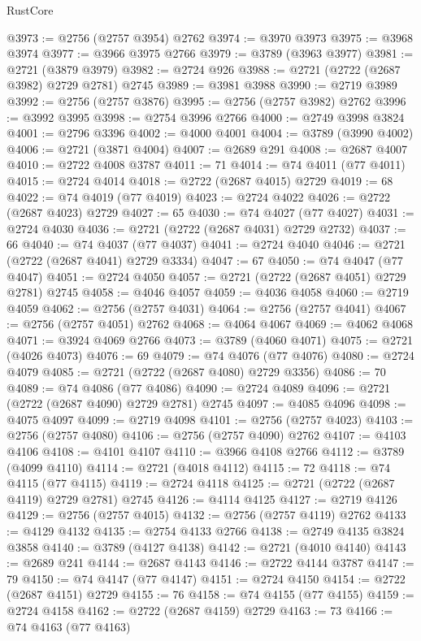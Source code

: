 \begin{lexlean}{RustCore}
\begin{coremodule}
@3973 := @2756 (@2757 @3954) @2762
@3974 := @3970 @3973
@3975 := @3968 @3974
@3977 := @3966 @3975 @2766
@3979 := @3789 (@3963 @3977)
@3981 := @2721 (@3879 @3979)
@3982 := @2724 @926
@3988 := @2721 (@2722 (@2687 @3982) @2729 @2781) @2745
@3989 := @3981 @3988
@3990 := @2719 @3989
@3992 := @2756 (@2757 @3876)
@3995 := @2756 (@2757 @3982) @2762
@3996 := @3992 @3995
@3998 := @2754 @3996 @2766
@4000 := @2749 @3998 @3824
@4001 := @2796 @3396
@4002 := @4000 @4001
@4004 := @3789 (@3990 @4002)
@4006 := @2721 (@3871 @4004)
@4007 := @2689 @291
@4008 := @2687 @4007
@4010 := @2722 @4008 @3787
@4011 := 71
@4014 := @74 @4011 (@77 @4011)
@4015 := @2724 @4014
@4018 := @2722 (@2687 @4015) @2729
@4019 := 68
@4022 := @74 @4019 (@77 @4019)
@4023 := @2724 @4022
@4026 := @2722 (@2687 @4023) @2729
@4027 := 65
@4030 := @74 @4027 (@77 @4027)
@4031 := @2724 @4030
@4036 := @2721 (@2722 (@2687 @4031) @2729 @2732)
@4037 := 66
@4040 := @74 @4037 (@77 @4037)
@4041 := @2724 @4040
@4046 := @2721 (@2722 (@2687 @4041) @2729 @3334)
@4047 := 67
@4050 := @74 @4047 (@77 @4047)
@4051 := @2724 @4050
@4057 := @2721 (@2722 (@2687 @4051) @2729 @2781) @2745
@4058 := @4046 @4057
@4059 := @4036 @4058
@4060 := @2719 @4059
@4062 := @2756 (@2757 @4031)
@4064 := @2756 (@2757 @4041)
@4067 := @2756 (@2757 @4051) @2762
@4068 := @4064 @4067
@4069 := @4062 @4068
@4071 := @3924 @4069 @2766
@4073 := @3789 (@4060 @4071)
@4075 := @2721 (@4026 @4073)
@4076 := 69
@4079 := @74 @4076 (@77 @4076)
@4080 := @2724 @4079
@4085 := @2721 (@2722 (@2687 @4080) @2729 @3356)
@4086 := 70
@4089 := @74 @4086 (@77 @4086)
@4090 := @2724 @4089
@4096 := @2721 (@2722 (@2687 @4090) @2729 @2781) @2745
@4097 := @4085 @4096
@4098 := @4075 @4097
@4099 := @2719 @4098
@4101 := @2756 (@2757 @4023)
@4103 := @2756 (@2757 @4080)
@4106 := @2756 (@2757 @4090) @2762
@4107 := @4103 @4106
@4108 := @4101 @4107
@4110 := @3966 @4108 @2766
@4112 := @3789 (@4099 @4110)
@4114 := @2721 (@4018 @4112)
@4115 := 72
@4118 := @74 @4115 (@77 @4115)
@4119 := @2724 @4118
@4125 := @2721 (@2722 (@2687 @4119) @2729 @2781) @2745
@4126 := @4114 @4125
@4127 := @2719 @4126
@4129 := @2756 (@2757 @4015)
@4132 := @2756 (@2757 @4119) @2762
@4133 := @4129 @4132
@4135 := @2754 @4133 @2766
@4138 := @2749 @4135 @3824 @3858
@4140 := @3789 (@4127 @4138)
@4142 := @2721 (@4010 @4140)
@4143 := @2689 @241
@4144 := @2687 @4143
@4146 := @2722 @4144 @3787
@4147 := 79
@4150 := @74 @4147 (@77 @4147)
@4151 := @2724 @4150
@4154 := @2722 (@2687 @4151) @2729
@4155 := 76
@4158 := @74 @4155 (@77 @4155)
@4159 := @2724 @4158
@4162 := @2722 (@2687 @4159) @2729
@4163 := 73
@4166 := @74 @4163 (@77 @4163)

\end{coremodule}
\end{lexlean}
